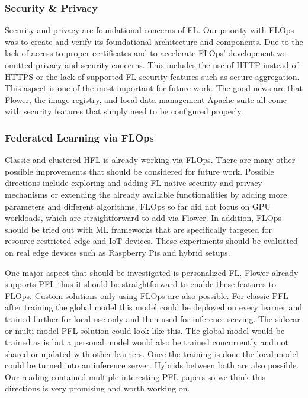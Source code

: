 \subsubsection{Security \& Privacy}
Security and privacy are foundational concerns of FL.
Our priority with FLOps was to create and verify its foundational architecture and components.
Due to the lack of access to proper certificates and to accelerate FLOps' development we omitted privacy and security concerns.
This includes the use of HTTP instead of HTTPS or the lack of supported FL security features such as secure aggregation.
This aspect is one of the most important for future work.
The good news are that Flower, the image registry, and local data management Apache suite all come with security features that simply need to be configured properly.

\subsubsection{Federated Learning via FLOps}
Classic and clustered HFL is already working via FLOps.
There are many other possible improvements that should be considered for future work.
Possible directions include exploring and adding FL native security and privacy mechanisms or extending the already available functionalities by adding more parameters and different algorithms.
FLOps so far did not focus on GPU workloads, which are straightforward to add via Flower.
In addition, FLOps should be tried out with ML frameworks that are specifically targeted for resource restricted edge and IoT devices.
These experiments should be evaluated on real edge devices such as Raspberry Pis and hybrid setups.

One major aspect that should be investigated is personalized FL.
Flower already supports PFL thus it should be straightforward to enable these features to FLOps.
Custom solutions only using FLOps are also possible.
For classic PFL after training the global model this model could be deployed on every learner and trained further for local use only and then used for inference serving.
The sidecar or multi-model PFL solution could look like this.
The global model would be trained as is but a personal model would also be trained concurrently and not shared or updated with other learners.
Once the training is done the local model could be turned into an inference server.
Hybrids between both are also possible.
Our reading contained multiple interesting PFL papers so we think this directions is very promising and worth working on.


